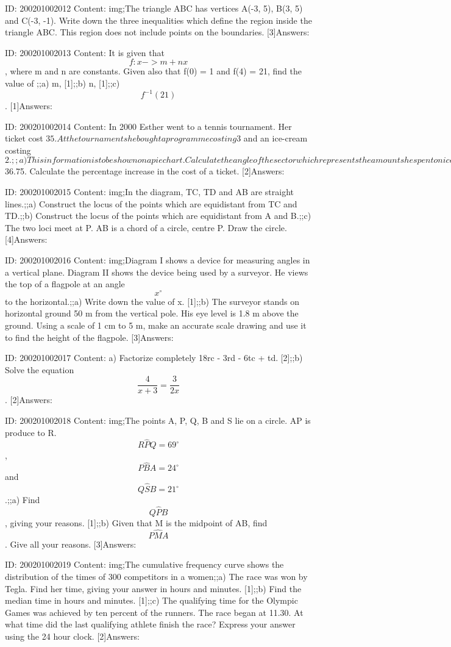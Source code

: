 \documentclass{article}
\begin{document}
ID: 200201002012
Content:
img;The triangle ABC has vertices A(-3, 5), B(3, 5) and C(-3, -1). Write down the three inequalities which define the region inside the triangle ABC. This region does not include points on the boundaries. [3]Answers:

ID: 200201002013
Content:
It is given that $$f:x->m+nx$$, where m and n are constants. Given also that f(0) = 1 and f(4) = 21, find the value of ;;a) m, [1];;b) n, [1];;c) $$f^{-1}(21)$$. [1]Answers:

ID: 200201002014
Content:
In 2000 Esther went to a tennis tournament. Her ticket cost $35. At the tournament she bought a programme costing $3 and an ice-cream costing $2.;;a) This information is to be shown on a pie chart. Calculate the angle of the sector which represents the amount she spent on ice-cream. [2];;b) In 2001 the cost of a ticket was $36.75. Calculate the percentage increase in the cost of a ticket. [2]Answers:

ID: 200201002015
Content:
img;In the diagram, TC, TD and AB are straight lines.;;a) Construct the locus of the points which are equidistant from TC and TD.;;b) Construct the locus of the points which are equidistant from A and B.;;c) The two loci meet at P. AB is a chord of a circle, centre P. Draw the circle. [4]Answers:

ID: 200201002016
Content:
img;Diagram I shows a device for measuring angles in a vertical plane. Diagram II shows the device being used by a surveyor. He views the top of a flagpole at an angle $$x^{\circ}$$ to the horizontal.;;a) Write down the value of x. [1];;b) The surveyor stands on horizontal ground 50 m from the vertical pole. His eye level is 1.8 m above the ground. Using a scale of 1 cm to 5 m, make an accurate scale drawing and use it to find the height of the flagpole. [3]Answers:

ID: 200201002017
Content:
a) Factorize completely 18rc - 3rd - 6tc + td. [2];;b) Solve the equation $$\frac{4}{x+3}=\frac{3}{2x}$$. [2]Answers:

ID: 200201002018
Content:
img;The points A, P, Q, B and S lie on a circle. AP is produce to R. $$R \hat PQ=69^{\circ}$$, $$P \hat BA=24^{\circ}$$ and $$Q \hat SB=21^{\circ}$$.;;a) Find $$Q \hat PB$$, giving your reasons. [1];;b) Given that M is the midpoint of AB, find $$P \hat MA$$. Give all your reasons. [3]Answers:

ID: 200201002019
Content:
img;The cumulative frequency curve shows the distribution of the times of 300 competitors in a women;;a) The race was won by Tegla. Find her time, giving your answer in hours and minutes. [1];;b) Find the median time in hours and minutes. [1];;c) The qualifying time for the Olympic Games was achieved by ten percent of the runners. The race began at 11.30. At what time did the last qualifying athlete finish the race? Express your answer using the 24 hour clock. [2]Answers:
\end{document}
